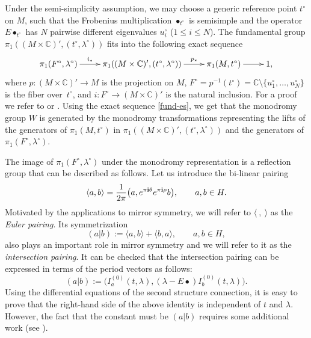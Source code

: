 \documentclass[10pt,a4paper]{article}
\numberwithin{equation}{section}
\newcommand{\CC}{\mathbb{C}}
\newcommand{\ii}{\mathbf{i}}
\begin{document}
Under the semi-simplicity
assumption, we may choose a generic reference point $t^\circ$ on $M$, such that
the Frobenius multiplication $\bullet_{t^\circ}$ is semisimple and the
operator $E\bullet_{t^\circ}$ has $N$ pairwise different eigenvalues
$u_i^\circ$ ($1\leq i\leq N$). The fundamental group $\pi_1((M\times
\CC)', (t^\circ,\lambda^\circ))$ fits into the following exact sequence
\begin{equation}\label{fund-es}
\xymatrix{
\pi_1(F^\circ,\lambda^\circ) \ar[r]^-{i_*} &
\pi_1((M\times \CC)', (t^\circ,\lambda^\circ) ) \ar[r]^-{p_*} &
\pi_1(M,t^\circ)\ar[r] &
1,}
\end{equation}
where $p\colon (M\times \CC)'\to M$ is the projection on $M$,
$F^\circ=p^{-1}(t^\circ)=\CC\setminus{\{u_1^\circ,\dots,u_N^\circ\}}$
is the fiber over~$t^\circ$, and
$i\colon F^\circ\to (M\times \CC)'$ is the natural inclusion. For a proof we refer to
\cite[Proposition~5.6.4]{Shimada:ln} or \cite[Lemma 1.5\,(C)]{Nori-zariski_conj}.
Using the exact sequence \eqref{fund-es}, we get that the monodromy
group $W$ is generated by the monodromy transformations
representing the lifts of the generators of $\pi_1(M,t^\circ)$ in
$\pi_1((M\times \CC)', (t^\circ, \lambda^\circ))$ and the
generators of $\pi_1(F^\circ,\lambda^\circ)$.

The image of $\pi_1(F^\circ,\lambda^\circ)$ under the monodromy
representation is a reflection group that can be described as
follows. Let us introduce the bi-linear pairing
\begin{equation}\label{euler-pairing}
\langle a,b\rangle = \frac{1}{2\pi}
\big( a, {\rm e}^{\pi\ii \theta} {\rm e}^{\pi\ii \rho} b\big),\qquad
a,b\in H.
\end{equation}
Motivated by the applications to mirror symmetry, we will refer to $\langle\ ,\ \rangle$ as the {\em Euler pairing}. Its symmetrization
\begin{equation}\label{inters-pairing:numerical}
(a|b):= \langle a, b\rangle + \langle b, a\rangle,\qquad a,b\in H,
\end{equation}
also plays an important role in mirror symmetry and we will refer to it as the {\em intersection pairing}. It can be checked that the intersection pairing can be expressed in terms of the period vectors as follows:
\[%
(a|b):=\big(I^{(0)}_a(t,\lambda),(\lambda-E\bullet)I^{(0)}_b(t,\lambda)\big).
\]
Using the differential equations of the second structure connection, it is
easy to prove that the right-hand side of the above identity is independent of $t$ and $\lambda$. However, the fact that the constant must be $(a|b)$ requires some additional work (see \cite{MilSa}).
\end{document}
